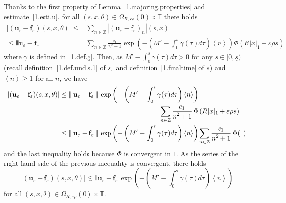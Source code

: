 \documentclass[AHL,Unicode,longabstracts,published]{cedram}
\theoremstyle{plain}
\newcommand*\e{\varepsilon}
\newcommand*\Z{{\mathbb Z}}
\newcommand*\g{\gamma}
\newcommand{\ubf}{{\mathbf u}}
\newcommand*\f{{\mathbf f}}
\newcommand*\dsp{\displaystyle}
\newcommand*\und{\underline}
\DeclarePairedDelimiter{\VERT}{|\mkern -1.6mu|\mkern -1.6mu|}{|\mkern -1.6mu|\mkern -1.6mu|}
\begin{document}
Thanks to the first property of Lemma~\ref{1.majoring.properties} and estimate~\eqref{1.esti.u}, for all $(s,x,\theta)\in\Omega_{R,\e\rho}(0)\times\mathbb{T}$ there holds
\begin{align*}
|(\ubf_{\e}-\f_{\e})(s,x,\theta)| \leq &\sum_{n\in\Z} |(\ubf_{\e}-\f_{\e})_n|(s,x) \\
\leq \dsp \VERT{\ubf_{\e}-\f_{\e}} &\sum_{n\in\Z} \frac{\dsp c_1}{\dsp n^2+1} \exp\left(-\left(M'- \int_{0}^{s} \g(\tau) d\tau \right) \left<n\right> \right) \Phi\left(R|x|_1 + \e\rho s\right)
\end{align*}
where $\g$ is defined in~\eqref{1.def.g}. Then, as $M'- \int_{0}^{s} \g(\tau) d\tau >0$ for any $s\in[0,\und{s})$ (recall definition~\eqref{1.def.und.s.1} of $\und{s}_1$ and definition~\eqref{1.finaltime} of $\und{s}$) and $\left<n\right> \geq 1$ for all $n$, we have
\begin{align*}
|(\ubf_{\e}-\f_{\e})(s,x,\theta)| & \leq \dsp \VERT{\ubf_{\e} - \f_{\e}}\,\exp\left(-\left(M'- \int_{0}^{s} \g(\tau) d\tau \right) \left<n\right> \right)\\
& \mkern263mu \sum_{n\in\Z} \frac{\dsp c_1}{\dsp n^2+1} \,\Phi\left(R|x|_1 + \e\rho s\right) \\
& \leq \dsp \VERT{\ubf_{\e} - \f_{\e}}\,\exp\left(-\left(M'- \int_{0}^{s} \g(\tau) d\tau \right) \left<n\right> \right) \sum_{n\in\Z} \frac{\dsp c_1}{\dsp n^2+1} \,\Phi(1)
\end{align*}
and the last inequality holds because $\Phi$ is convergent in $1$. As the series of the right-hand side of the previous inequality is convergent, there holds
\[
|(\ubf_{\e}-\f_{\e})(s,x,\theta)| \lesssim \dsp \VERT{\ubf_{\e} - \f_{\e}}\,\exp\left(-\left(M'- \int_{0}^{s} \g(\tau) d\tau \right) \left<n\right> \right)
\]
for all $(s,x,\theta)\in\Omega_{R,\e\rho}(0)\times\mathbb{T}$.
\end{document}
